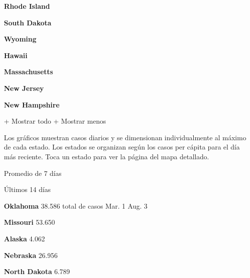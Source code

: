 \textbf{Rhode Island}

\href{https://www.nytimes.com/interactive/2020/us/south-dakota-coronavirus-cases.html}{}

\textbf{South Dakota}

\href{https://www.nytimes.com/interactive/2020/us/wyoming-coronavirus-cases.html}{}

\textbf{Wyoming}

\href{https://www.nytimes.com/interactive/2020/us/hawaii-coronavirus-cases.html}{}

\textbf{Hawaii}

\href{https://www.nytimes.com/interactive/2020/us/massachusetts-coronavirus-cases.html}{}

\textbf{Massachusetts}

\href{https://www.nytimes.com/interactive/2020/us/new-jersey-coronavirus-cases.html}{}

\textbf{New Jersey}

\href{https://www.nytimes.com/interactive/2020/us/new-hampshire-coronavirus-cases.html}{}

\textbf{New Hampshire}

+ Mostrar todo + Mostrar menos

Los gráficos muestran casos diarios y se dimensionan individualmente al
máximo de cada estado. Los estados se organizan según los casos per
cápita para el día más reciente. Toca un estado para ver la página del
mapa detallado.

\href{https://www.nytimes.com/interactive/2020/us/oklahoma-coronavirus-cases.html}{}

Promedio de 7 días

Últimos 14 días

\textbf{Oklahoma} 38.586 total de casos Mar. 1 Aug. 3

\href{https://www.nytimes.com/interactive/2020/us/missouri-coronavirus-cases.html}{}

\textbf{Missouri} 53.650

\href{https://www.nytimes.com/interactive/2020/us/alaska-coronavirus-cases.html}{}

\textbf{Alaska} 4.062

\href{https://www.nytimes.com/interactive/2020/us/nebraska-coronavirus-cases.html}{}

\textbf{Nebraska} 26.956

\href{https://www.nytimes.com/interactive/2020/us/north-dakota-coronavirus-cases.html}{}

\textbf{North Dakota} 6.789

